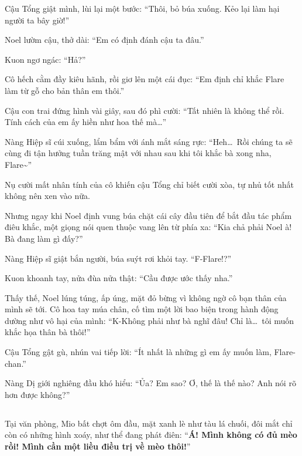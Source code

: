 \documentclass[../main.tex]{subfiles}
\begin{document}
Cậu Tổng giật mình, lùi lại một bước: ``Thôi, bỏ búa xuống. Kẻo lại làm hại người ta bây giờ!''

Noel lườm cậu, thở dài: ``Em có định đánh cậu ta đâu.''

Kuon ngơ ngác: ``Hả?''

Cô hếch cằm đầy kiêu hãnh, rồi giơ lên một cái đục: ``Em định chỉ khắc Flare làm từ gỗ cho bản thân em thôi.''

Cậu con trai đứng hình vài giây, sau đó phì cười: ``Tất nhiên là không thể rồi. Tính cách của em ấy hiền như hoa thế mà\dots''

Nàng Hiệp sĩ cúi xuống, lẩm bẩm với ánh mắt sáng rực: ``Heh\dots\ Rồi chúng ta sẽ cùng đi tận hưởng tuần trăng mật với nhau sau khi tôi khắc bà xong nha, Flare\~{}''

Nụ cười mất nhân tính của cô khiến cậu Tổng chỉ biết cười xòa, tự nhủ tốt nhất không nên xen vào nữa.

Nhưng ngay khi Noel định vung búa chặt cái cây đầu tiên để bắt đầu tác phẩm điêu khắc, một giọng nói quen thuộc vang lên từ phía xa: ``Kia chả phải Noel à! Bà đang làm gì đấy?''

Nàng Hiệp sĩ giật bắn người, búa suýt rơi khỏi tay. ``F-Flare!?''


Kuon khoanh tay, nửa đùa nửa thật: ``Cầu được ước thấy nha.''

Thấy thế, Noel lúng túng, ấp úng, mặt đỏ bừng vì không ngờ cô bạn thân của mình sẽ tới. Cô hoa tay múa chân, cố tìm một lời bao biện trong hành động dường như vô hại của mình:  ``K-Không phải như bà nghĩ đâu! Chỉ là\dots\ tôi muốn khắc họa thân bà thôi!''


Cậu Tổng gật gù, nhún vai tiếp lời: ``Ít nhất là những gì em ấy muốn làm, Flare-chan.''

Nàng Dị giới nghiêng đầu khó hiểu: ``Ủa? Em sao? Ơ, thế là thế nào? Anh nói rõ hơn được không?''

\subsection*{\label{ep-S13.VI}}

Tại văn phòng, Mio bất chợt ôm đầu, mặt xanh lè như tàu lá chuối, đôi mắt chỉ còn có những hình xoáy, như thể đang phát điên: ``\textbf{Á! Mình không có đủ mèo rồi! Mình cần một liều điều trị về mèo thôi!}''
\end{document}
